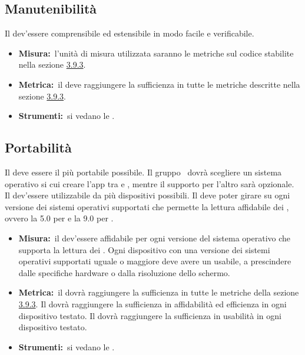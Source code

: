 	\subsection{Manutenibilità}
		Il  dev'essere comprensibile ed estensibile in modo facile e verificabile.
		\begin{itemize}
			\item \textbf{Misura:}\ l'unità di misura utilizzata saranno le metriche sul codice stabilite nella sezione \hyperref[sec:3.9.3]{3.9.3}.
			\item \textbf{Metrica:}\ il  deve raggiungere la sufficienza in tutte le metriche descritte nella sezione \hyperref[sec:3.9.3]{3.9.3}.
			\item \textbf{Strumenti:}\ si vedano le \NPdoc.
		\end{itemize}
	\subsection{Portabilità}
		Il  deve essere il più portabile possibile. Il gruppo \AUTORE\ dovrà scegliere un sistema operativo si cui creare l'app tra  e , mentre il supporto per l'altro sarà opzionale. Il  dev'essere utilizzabile da più dispositivi possibili. Il  deve poter girare su ogni versione dei sistemi operativi supportati che permette la lettura affidabile dei , ovvero la 5.0 per  e la 9.0 per .
		\begin{itemize}
			\item \textbf{Misura:}\ il  dev'essere affidabile per ogni versione del sistema operativo che supporta la lettura dei . Ogni dispositivo con una versione dei sistemi operativi supportati uguale o maggiore deve avere un  usabile, a prescindere dalle specifiche hardware o dalla risoluzione dello schermo.
			\item \textbf{Metrica:}\ il  dovrà raggiungere la sufficienza in tutte le metriche della sezione \hyperref[sec:3.9.3]{3.9.3}. Il  dovrà raggiungere la sufficienza in affidabilità ed efficienza in ogni dispositivo testato. Il  dovrà raggiungere la sufficienza in usabilità in ogni dispositivo testato.
			\item \textbf{Strumenti:}\ si vedano le \NPdoc.
		\end{itemize}
